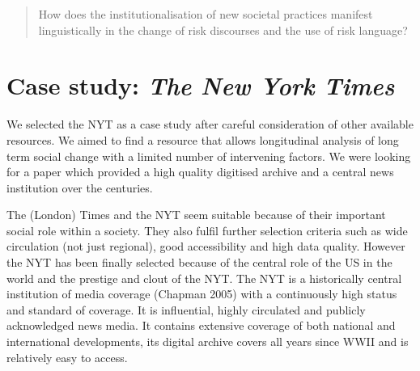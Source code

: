 \documentclass{report}
\begin{document}
\begin{quotation}
How does the institutionalisation of new societal practices manifest linguistically in the change of risk discourses and the use of risk language? 
\end{quotation}





\section{Case study: \emph{The New York Times}}

We selected the NYT as a case study after careful consideration of other available resources. We aimed to find a resource that allows longitudinal analysis of long term social change with a limited number of intervening factors. We were looking for a paper which provided a high quality digitised archive and a central news institution over the centuries. 

The (London) Times and the NYT seem suitable because of their important social role within a society. They also fulfil further selection criteria such as wide circulation (not just regional), good accessibility and high data quality. However the NYT has been finally selected because of the central role of the US in the world and the prestige and clout of the NYT. The NYT is a historically central institution of media coverage (Chapman 2005) with a continuously high status and standard of coverage. It is influential, highly circulated and publicly acknowledged news media. It contains extensive coverage of both national and international developments, its digital archive covers all years since WWII and is relatively easy to access.
\end{document}
